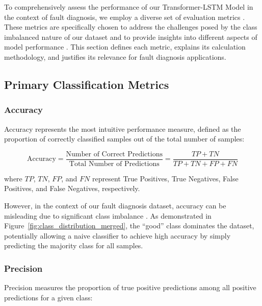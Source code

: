 To comprehensively assess the performance of our Transformer-LSTM Model in the context of fault diagnosis, we employ a diverse set of evaluation metrics \citep{hastie2009elements, he2009learning}. These metrics are specifically chosen to address the challenges posed by the class imbalanced nature of our dataset and to provide insights into different aspects of model performance \citep{krawczyk2016learning, chawla2002smote}. This section defines each metric, explains its calculation methodology, and justifies its relevance for fault diagnosis applications.

\subsection{Primary Classification Metrics}
\label{subsec:primary_metrics}

\subsubsection{Accuracy}
\label{subsubsec:accuracy}

Accuracy represents the most intuitive performance measure, defined as the proportion of correctly classified samples out of the total number of samples:

\begin{equation}
\text{Accuracy} = \frac{\text{Number of Correct Predictions}}{\text{Total Number of Predictions}} = \frac{TP + TN}{TP + TN + FP + FN}
\end{equation}

where $TP$, $TN$, $FP$, and $FN$ represent True Positives, True Negatives, False Positives, and False Negatives, respectively.

However, in the context of our fault diagnosis dataset, accuracy can be misleading due to significant class imbalance \citep{he2009learning, krawczyk2016learning}. As demonstrated in Figure~\ref{fig:class_distribution_merged}, the ``good'' class dominates the dataset, potentially allowing a naive classifier to achieve high accuracy by simply predicting the majority class for all samples.

\subsubsection{Precision}
\label{subsubsec:precision}

Precision measures the proportion of true positive predictions among all positive predictions for a given class:

